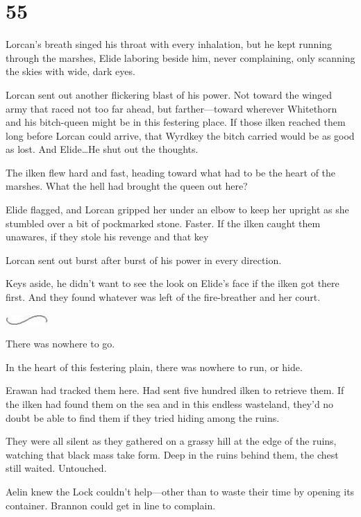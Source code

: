 
\chapter{55}

Lorcan's breath singed his throat with every inhalation, but he kept running through the marshes, Elide laboring beside him, never complaining, only scanning the skies with wide, dark eyes.

Lorcan sent out another flickering blast of his power.
Not toward the winged army that raced not too far ahead, but farther---toward wherever Whitethorn and his bitch-queen might be in this festering place.
If those ilken reached them long before Lorcan could arrive, that Wyrdkey the bitch carried would be as good as lost.
And Elide\ldots He shut out the thoughts.

The ilken flew hard and fast, heading toward what had to be the heart of the marshes.
What the hell had brought the queen out here?

Elide flagged, and Lorcan gripped her under an elbow to keep her upright as she stumbled over a bit of pockmarked stone.
Faster.
If the ilken caught them unawares, if they stole his revenge and that key 

Lorcan sent out burst after burst of his power in every direction.

Keys aside, he didn't want to see the look on Elide's face if the ilken got there first.
And they found whatever was left of the fire-breather and her court.

\begin{center}
	\includegraphics[width=0.65in,height=0.13in]{images/seperator}
\end{center}

There was nowhere to go.

In the heart of this festering plain, there was nowhere to run, or hide.

Erawan had tracked them here.
Had sent five hundred ilken to retrieve them.
If the ilken had found them on the sea and in this endless wasteland, they'd no doubt be able to find them if they tried hiding among the ruins.

They were all silent as they gathered on a grassy hill at the edge of the ruins, watching that black mass take form.
Deep in the ruins behind them, the chest still waited.
Untouched.

Aelin knew the Lock couldn't help---other than to waste their time by opening its container.
Brannon could get in line to complain.


